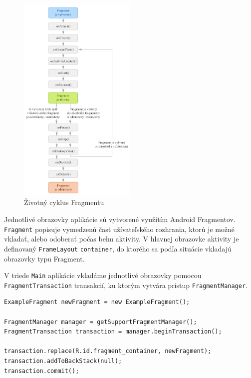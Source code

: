 \begin{figure}[h!]
    \centering
    \includegraphics[width=0.5\textwidth]{figures/ui/fragment_lifecycle}
    \caption{Životný cyklus Fragmentu \cite{Android}}
    \label{fig:fragment_lifecycle}
\end{figure}

Jednotlivé obrazovky aplikácie sú vytvorené využitím Android Fragmentov. \texttt{Fragment} popisuje vymedzenú
časť užívateľského rozhrania, ktorú je možné vkladať, alebo odoberať počas behu aktivity. 
V hlavnej obrazovke aktivity je definovaný \texttt{FrameLayout} \texttt{container}, do ktorého sa podľa
situácie vkladajú obrazovky typu Fragment.

V triede \texttt{Main} aplikácie vkladáme jednotlivé obrazovky pomocou \texttt{FragmentTransaction} transakcií,
ku ktorým vytvára prístup \texttt{FragmentManager}.

\begin{lstlisting}[morekeywords={ExampleFragment,FragmentManager,FragmentTransaction,R}]
ExampleFragment newFragment = new ExampleFragment();

FragmentManager manager = getSupportFragmentManager();
FragmentTransaction transaction = manager.beginTransaction();

transaction.replace(R.id.fragment_container, newFragment);
transaction.addToBackStack(null);
transaction.commit();
\end{lstlisting}

